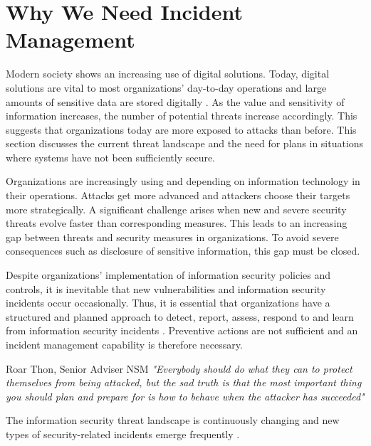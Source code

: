 \section{Why We Need Incident Management}
\label{sec:threatLandscape}
Modern society shows an increasing use of digital solutions. Today, digital solutions are vital to most organizations' day-to-day operations and large amounts of sensitive data are stored digitally \cite{KriposTrender}. As the value and sensitivity of information increases, the number of potential threats increase accordingly. This suggests that organizations today are more exposed to attacks than before. This section discusses the current threat landscape and the need for plans in situations where systems have not been sufficiently secure. 

Organizations are increasingly using and depending on information technology in their operations. Attacks get more advanced and attackers choose their targets more strategically. A significant challenge arises when new and severe security threats evolve faster than corresponding measures. This leads to an increasing gap between threats and security measures in organizations. To avoid severe consequences such as disclosure of sensitive information, this gap must be closed.

Despite organizations' implementation of information security policies and controls, it is inevitable that new vulnerabilities and information security incidents occur occasionally. Thus, it is essential that organizations have a structured and planned approach to detect, report, assess, respond to and learn from information security incidents \cite{ISO/IEC27035}. Preventive actions are not sufficient and an incident management capability is therefore necessary.

\begin{newquote}{Roar Thon, Senior Adviser \acs{NSM}}
\textit{"Everybody should do what they can to protect themselves from being attacked, but the sad truth is that the most important thing you should plan and prepare for is how to behave when the attacker has succeeded"}
\end{newquote}

The information security threat landscape is continuously changing and new types of security-related incidents emerge frequently \cite{nist800-61}. %

